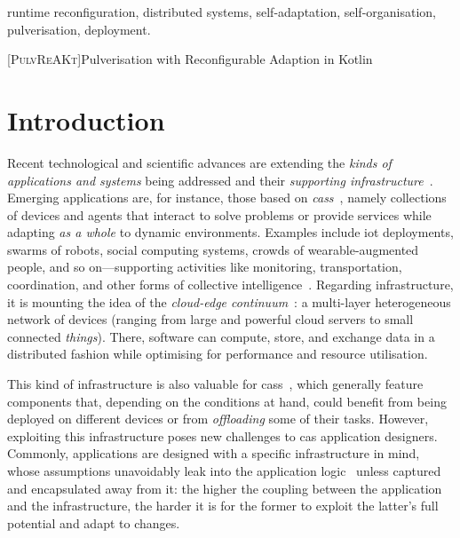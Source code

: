 \documentclass[conference]{IEEEtran}
\newcommand{\meta}[1]{{\color{blue}#1}}
\begin{document}
\begin{IEEEkeywords}
runtime reconfiguration, distributed systems, self-adaptation, self-organisation, pulverisation, deployment.
\end{IEEEkeywords}

[\textsc{PulvReAKt}]{Pulverisation with Reconfigurable Adaption in Kotlin}
\newcommand{\ourframework}{\ac{ourframework}}


\section{Introduction}\label{sec:introduction}

Recent technological and scientific advances
 are extending 
 the \emph{kinds of applications and systems} being addressed and
their \emph{supporting infrastructure}~\cite{DBLP:journals/iot/GillXOPBSGSWASM22}.
%
Emerging applications
 are, for instance, those based on \emph{\acp{cas}}~\cite{DBLP:journals/computer/Abowd16,DBLP:journals/sttt/NicolaJW20},
 namely collections of devices and agents
 that interact to solve problems or provide services while adapting \emph{as a whole} to dynamic environments.
%
Examples include 
  \ac{iot} deployments, 
  swarms of robots,
  social computing systems,
  crowds of wearable-augmented people, and so on---supporting activities like monitoring,
  transportation, coordination, and other forms of collective intelligence~\cite{casadei2023artl-ci}.
%
Regarding infrastructure,
 it is mounting the idea of the \emph{cloud-edge continuum}~\cite{DBLP:journals/iot/BittencourtISFM18}: 
a multi-layer heterogeneous network of devices (ranging from large and powerful cloud servers to small connected \emph{things}).
There, software can compute, store, and exchange data in a distributed fashion
while
optimising for performance and resource utilisation.
%

This kind of infrastructure is also valuable for  \acp{cas}~\cite{DBLP:journals/tpds/HongCHGZ19,DBLP:journals/comsur/WangZZMLW20,DBLP:journals/comsur/AfrinJRRWH21,IEEE-IoTJ-pulverization-simulation},
which generally feature components that,
depending on the conditions at hand,
could benefit from being deployed on different devices or from \emph{offloading} some of their  tasks.
%
However, exploiting this infrastructure
 poses new challenges to \ac{cas} application designers.
%
Commonly, applications are designed with a specific infrastructure in mind,
whose assumptions unavoidably leak into the application logic~\cite{Spolsky2004}
unless captured and encapsulated away from it:
the higher the coupling between the application and the infrastructure,
the harder it is for the former to exploit the latter's full potential and adapt to changes.
\end{document}
